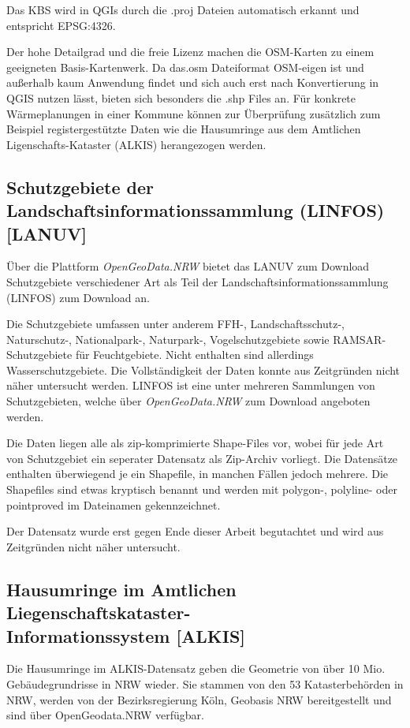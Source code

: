 			Das KBS wird in QGIs durch die .proj Dateien automatisch erkannt und entspricht EPSG:4326.

			Der hohe Detailgrad und die freie Lizenz machen die OSM-Karten zu einem geeigneten Basis-Kartenwerk. Da das.osm Dateiformat OSM-eigen ist und außerhalb kaum Anwendung findet und sich auch erst nach Konvertierung in QGIS nutzen lässt, bieten sich besonders die .shp Files an. Für konkrete Wärmeplanungen in einer Kommune können zur Überprüfung zusätzlich zum Beispiel registergestützte Daten wie die Hausumringe aus dem Amtlichen Ligenschafts-Kataster (ALKIS) herangezogen werden. 
		
		\subsection{Schutzgebiete der Landschaftsinformationssammlung (LINFOS) [LANUV]}
			Über die Plattform \textit{OpenGeoData.NRW} bietet das LANUV zum Download Schutzgebiete verschiedener Art als Teil der Landschaftsinformationssammlung (LINFOS) zum Download an. \cite{web_download_opengeodata_nrw}
			
			Die Schutzgebiete umfassen unter anderem FFH-, Landschaftsschutz-, Naturschutz-, Nationalpark-, Naturpark-, Vogelschutzgebiete sowie RAMSAR-Schutzgebiete für Feuchtgebiete. Nicht enthalten sind allerdings Wasserschutzgebiete. Die Vollständigkeit der Daten konnte aus Zeitgründen nicht näher untersucht werden. LINFOS ist eine unter mehreren Sammlungen von Schutzgebieten, welche über \textit{OpenGeoData.NRW} zum Download angeboten werden.
			
			Die Daten liegen alle als zip-komprimierte Shape-Files vor, wobei für jede Art von Schutzgebiet ein seperater Datensatz als Zip-Archiv vorliegt. Die Datensätze enthalten überwiegend je ein Shapefile, in manchen Fällen jedoch mehrere. Die Shapefiles sind etwas kryptisch benannt und werden mit polygon-, polyline- oder pointproved im Dateinamen gekennzeichnet.
			
			Der Datensatz wurde erst gegen Ende dieser Arbeit begutachtet und wird aus Zeitgründen nicht näher untersucht.
			
						
		\subsection{Hausumringe im Amtlichen Liegenschaftskataster-\\Informationssystem [ALKIS]}
			Die Hausumringe im ALKIS-Datensatz geben die Geometrie von über 10 Mio. Gebäudegrundrisse in NRW wieder. Sie stammen von den 53 Katasterbehörden in NRW, werden von der Bezirksregierung Köln, Geobasis NRW bereitgestellt und sind über OpenGeodata.NRW verfügbar. \cite{web_download_opengeodata_nrw}
			
